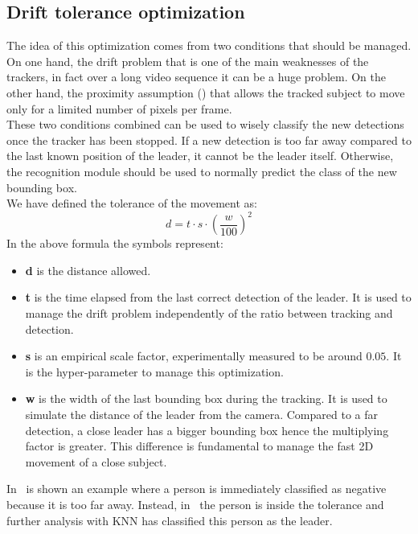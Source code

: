 \subsection{Drift tolerance optimization} \label{sec:driftOptimization}
The idea of this optimization comes from two conditions that should be managed. On one hand, the drift problem that is one of the main weaknesses of the trackers, in fact over a long video sequence it can be a huge problem. On the other hand, the proximity assumption () that allows the tracked subject to move only for a limited number of pixels per frame.\\
These two conditions combined can be used to wisely classify the new detections once the tracker has been stopped. If a new detection is too far away compared to the last known position of the leader, it cannot be the leader itself. Otherwise, the recognition module should be used to normally predict the class of the new bounding box.\\
We have defined the tolerance of the movement as:
$$d = t\cdot s\cdot\left(\frac{w}{100}\right)^{2}$$
In the above formula the symbols represent:
\begin{itemize}
	\item \textbf{d} is the distance allowed.
	\item \textbf{t} is the time elapsed from the last correct detection of the leader. It is used to manage the drift problem independently of the ratio between tracking and detection.
	\item \textbf{s} is an empirical scale factor, experimentally measured to be around $0.05$. It is the hyper-parameter to manage this optimization. 
	\item \textbf{w} is the width of the last bounding box during the tracking. It is used to simulate the distance of the leader from the camera. Compared to a far detection, a close leader has a bigger bounding box hence the multiplying factor is greater. This difference is fundamental to manage the fast 2D movement of a close subject.
\end{itemize}
In~ is shown an example where a person is immediately classified as negative because it is too far away. Instead, in~ the person is inside the tolerance and further analysis with KNN has classified this person as the leader.

